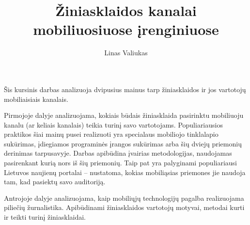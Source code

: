 \documentclass[kursinis-darbas]{vukf}
\begin{document}
	
\title{Žiniasklaidos kanalai mobiliuosiuose įrenginiuose}
\author{Linas Valiukas}

\maketitle
\tableofcontents


\begin{vukfAbstract}
	
Šis kursinis darbas analizuoja dvipusius mainus tarp žiniasklaidos ir jos vartotojų mobiliaisiais kanalais.

Pirmojoje dalyje analizuojama, kokiais būdais žiniasklaida pasirinktu mobiliuoju kanalu (ar keliais kanalais) teikia turinį savo vartotojams. Populiariausios praktikos šiai mainų pusei realizuoti yra specialaus mobiliojo tinklalapio sukūrimas, įdiegiamos programinės įrangos sukūrimas arba šių dviejų priemonių derinimas tarpusavyje. Darbas apibūdina įvairias metodologijas, naudojamas pasirenkant kurią nors iš šių priemonių. Taip pat yra palyginami populiariausi Lietuvos naujienų portalai – nustatoma, kokias mobiliąsias priemones jie naudoja tam, kad pasiektų savo auditoriją.

Antrojoje dalyje analizuojama, kaip mobiliųjų technologijų pagalba realizuojama piliečių žurnalistika. Apibūdinami žiniasklaidos vartotojų motyvai, metodai kurti ir teikti turinį žiniasklaidai.

\end{vukfAbstract}
\end{document}
